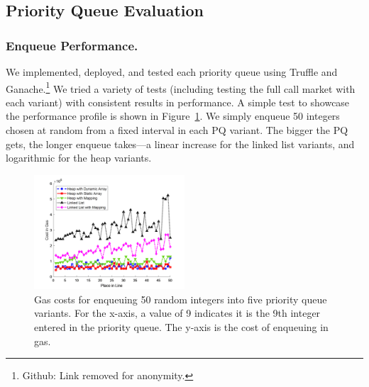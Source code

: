 
\subsection{Priority Queue Evaluation} 

\subsubsection{Enqueue Performance.} We implemented, deployed, and tested each priority queue using Truffle and Ganache.\footnote{Github: Link removed for anonymity.} We tried a variety of tests (including testing the full call market with each variant) with consistent results in performance. A simple test to showcase the performance profile is shown in Figure~\ref{fig:random_insertion}. We simply enqueue 50 integers chosen at random from a fixed interval in each PQ variant. The bigger the PQ gets, the longer enqueue takes---a linear increase for the linked list variants, and logarithmic for the heap variants. 



\begin{figure}[t]
\centering
\includegraphics[width=0.5\textwidth]{fig/random_insertion3.png}
\caption{\footnotesize{Gas costs for enqueuing 50 random integers into five priority queue variants. For the x-axis, a value of 9 indicates it is the 9th integer entered in the priority queue. The y-axis is the cost of enqueuing in gas.}  \label{fig:random_insertion}}
\end{figure}






